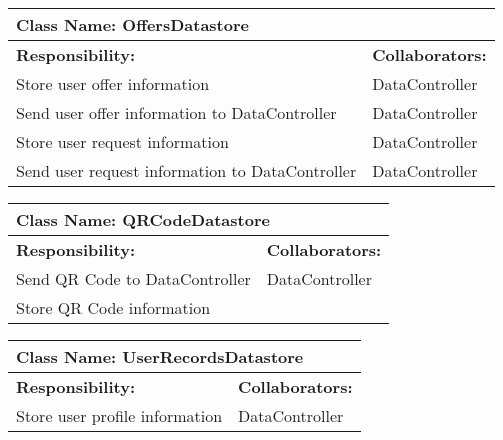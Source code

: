 \documentclass[english]{article}
\begin{document}
    \begin{table}[!ht]
        \centering
        \begin{tabular}{|p{8cm}|p{4cm}|}
        \hline 
        \multicolumn{2}{|l|}{\textbf{Class Name: OffersDatastore}} \\
        \hline
        \textbf{Responsibility:} & \textbf{Collaborators:} \\
        \hline
        Store user offer information & DataController\\
        \hline
        Send user offer information to DataController & DataController\\
        \hline
        Store user request information & DataController\\
        \hline
        Send user request information to DataController & DataController\\
        \hline
        \end{tabular}
    \end{table}
    \clearpage
    \begin{table}[!ht]
        \centering
        \begin{tabular}{|p{8cm}|p{4cm}|}
        \hline 
        \multicolumn{2}{|l|}{\textbf{Class Name: QRCodeDatastore}} \\
        \hline
        \textbf{Responsibility:} & \textbf{Collaborators:} \\
        \hline
        Send QR Code to DataController & DataController \\
        \hline
    Store QR Code information & \\
        \hline
        \end{tabular}
    \end{table}
    
    \begin{table}[!ht]
        \centering
        \begin{tabular}{|p{8cm}|p{4cm}|}
        \hline 
        \multicolumn{2}{|l|}{\textbf{Class Name: UserRecordsDatastore}} \\
        \hline
        \textbf{Responsibility:} & \textbf{Collaborators:} \\
        \hline
        Store user profile information & DataController \\
        \hline
        \end{tabular}
    \end{table}
    
    

\clearpage
\newpage
\appendix
\end{document}

